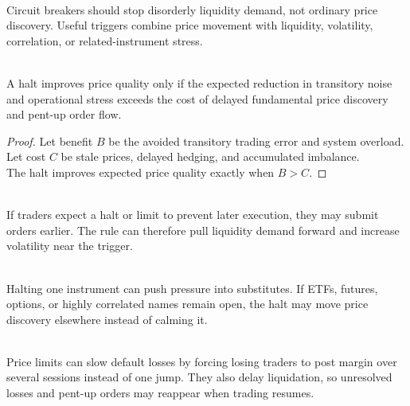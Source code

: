 \documentclass[a4paper,oneside,openany]{book}
\begin{document}
\begin{principle} \\
Circuit breakers should stop disorderly liquidity demand, not ordinary price discovery. Useful triggers combine price movement with liquidity, volatility, correlation, or related-instrument stress.
\end{principle}

\begin{proposition} \\
A halt improves price quality only if the expected reduction in transitory noise and operational stress exceeds the cost of delayed fundamental price discovery and pent-up order flow.
\begin{proof}
Let benefit $B$ be the avoided transitory trading error and system overload. Let cost $C$ be stale prices, delayed hedging, and accumulated imbalance.\\
The halt improves expected price quality exactly when $B>C$.
\end{proof}
\end{proposition}

\begin{caveat} \\
If traders expect a halt or limit to prevent later execution, they may submit orders earlier. The rule can therefore pull liquidity demand forward and increase volatility near the trigger.
\end{caveat}

\begin{caveat} \\
Halting one instrument can push pressure into substitutes. If ETFs, futures, options, or highly correlated names remain open, the halt may move price discovery elsewhere instead of calming it.
\end{caveat}

\begin{mechanism} \\
Price limits can slow default losses by forcing losing traders to post margin over several sessions instead of one jump. They also delay liquidation, so unresolved losses and pent-up orders may reappear when trading resumes.
\end{mechanism}
\end{document}
